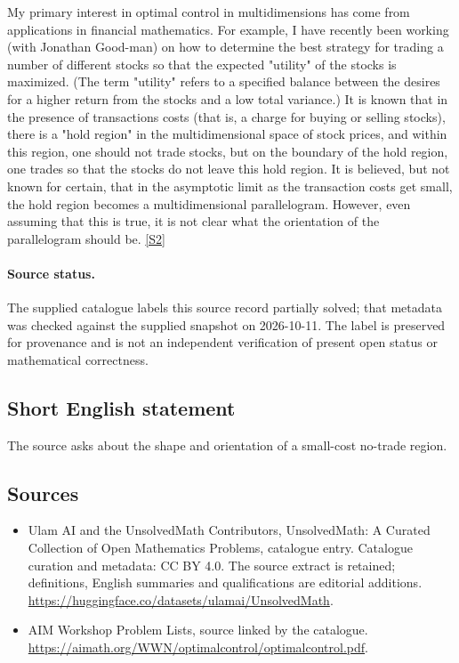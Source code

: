 \documentclass[11pt]{article}
\newcommand{\sref}[2]{\hyperlink{source:#1:#2}{[S#2]}}
\begin{document}
My primary interest in optimal control in multidimensions has come from applications in financial mathematics. For example, I have recently been working (with Jonathan Good-man) on how to determine the best strategy for trading a number of different stocks so that the expected "utility" of the stocks is maximized. (The term "utility" refers to a specified balance between the desires for a higher return from the stocks and a low total variance.) It is known that in the presence of transactions costs (that is, a charge for buying or selling stocks), there is a "hold region" in the multidimensional space of stock prices, and within this region, one should not trade stocks, but on the boundary of the hold region, one trades so that the stocks do not leave this hold region. It is believed, but not known for certain, that in the asymptotic limit as the transaction costs get small, the hold region becomes a multidimensional parallelogram. However, even assuming that this is true, it is not clear what the orientation of the parallelogram should be. \sref{statement}{2}
\paragraph{Source status.}
The supplied catalogue labels this source record partially solved; that metadata was checked against the supplied snapshot on 2026-10-11. The label is preserved for provenance and is not an independent verification of present open status or mathematical correctness.
\subsection{Short English statement}
The source asks about the shape and orientation of a small-cost no-trade region.
\subsection{Sources}
\begin{itemize}
\item[\hypertarget{source:statement:1}{S1}] Ulam AI and the UnsolvedMath Contributors, UnsolvedMath: A Curated Collection of Open Mathematics Problems, catalogue entry. Catalogue curation and metadata: CC BY 4.0. The source extract is retained; definitions, English summaries and qualifications are editorial additions.
\url{https://huggingface.co/datasets/ulamai/UnsolvedMath}.
\item[\hypertarget{source:statement:2}{S2}] AIM Workshop Problem Lists, source linked by the catalogue.
\url{https://aimath.org/WWN/optimalcontrol/optimalcontrol.pdf}.
\end{itemize}
\end{document}
